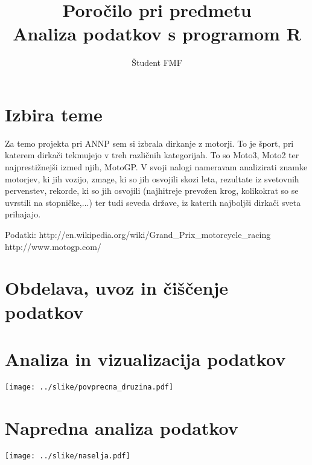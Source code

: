 \documentclass[11pt,a4paper]{article}
\begin{document}
\title{Poročilo pri predmetu \\
Analiza podatkov s programom R}
\author{Študent FMF}
\maketitle

\section{Izbira teme}

Za temo projekta pri ANNP sem si izbrala dirkanje z motorji. To je šport, pri katerem dirkači tekmujejo v treh različnih kategorijah. To so Moto3, Moto2 ter najprestižnejši izmed njih, MotoGP. V svoji nalogi nameravam analizirati znamke motorjev, ki jih vozijo, zmage, ki so jih osvojili skozi leta, rezultate iz svetovnih pervenstev, rekorde, ki so jih osvojili (najhitreje prevožen krog, kolikokrat so se uvrstili na stopničke,...) ter tudi seveda države, iz katerih najboljši dirkači sveta prihajajo. 


Podatki: http://en.wikipedia.org/wiki/Grand_Prix_motorcycle_racing
http://www.motogp.com/

\section{Obdelava, uvoz in čiščenje podatkov}

\section{Analiza in vizualizacija podatkov}

\texttt{[image: ../slike/povprecna\_druzina.pdf]}

\section{Napredna analiza podatkov}

\texttt{[image: ../slike/naselja.pdf]}
\end{document}
